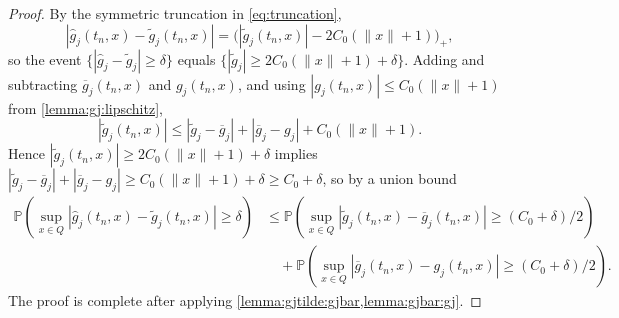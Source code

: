 \documentclass[11pt,reqno,a4paper]{amsart}
\theoremstyle{definition}
\numberwithin{equation}{section}
\newcommand{\widebar}[1]{\overline{#1}}
\renewcommand{\P}{\mathbb{P}}
\DeclareMathOperator{\1}{\mathbbm{1}}
\begin{document}
\begin{proof}
  By the symmetric truncation in \cref{eq:truncation},
  \begin{equation*}
    |\widehat{g}_j(t_n,x) - \widetilde{g}_j(t_n,x)| = \bigl(|\widetilde{g}_j(t_n,x)| - 2 C_0(\|x\|+1)\bigr)_+,
  \end{equation*}
  so the event $\{|\widehat{g}_j - \widetilde{g}_j| \geq \delta\}$ equals $\{|\widetilde{g}_j| \geq 2 C_0(\|x\|+1) + \delta\}$. Adding and subtracting $\widebar{g}_j(t_n,x)$ and $g_j(t_n,x)$, and using $|g_j(t_n,x)| \leq C_0(\|x\|+1)$ from \cref{lemma:gj:lipschitz},
  \begin{equation*}
    |\widetilde{g}_j(t_n,x)| \leq |\widetilde{g}_j - \widebar{g}_j| + |\widebar{g}_j - g_j| + C_0(\|x\|+1).
  \end{equation*}
  Hence $|\widetilde{g}_j(t_n,x)| \geq 2C_0(\|x\|+1) + \delta$ implies $|\widetilde{g}_j - \widebar{g}_j| + |\widebar{g}_j - g_j| \geq C_0(\|x\|+1) + \delta \geq C_0 + \delta$, so by a union bound
  \begin{align*}
    \P\!\left(\sup_{x \in Q} |\widehat{g}_j(t_n,x) - \widetilde{g}_j(t_n,x)| \geq \delta\right)
    & \leq \P\!\left(\sup_{x \in Q} |\widetilde{g}_j(t_n,x) - \widebar{g}_j(t_n,x)| \geq (C_0+\delta)/2\right)
    \\
    & \quad + \P\!\left(\sup_{x \in Q} |\widebar{g}_j(t_n,x) - g_j(t_n,x)| \geq (C_0+\delta)/2\right).
  \end{align*}
  The proof is complete after applying \cref{lemma:gjtilde:gjbar,lemma:gjbar:gj}.
\end{proof}
\end{document}
